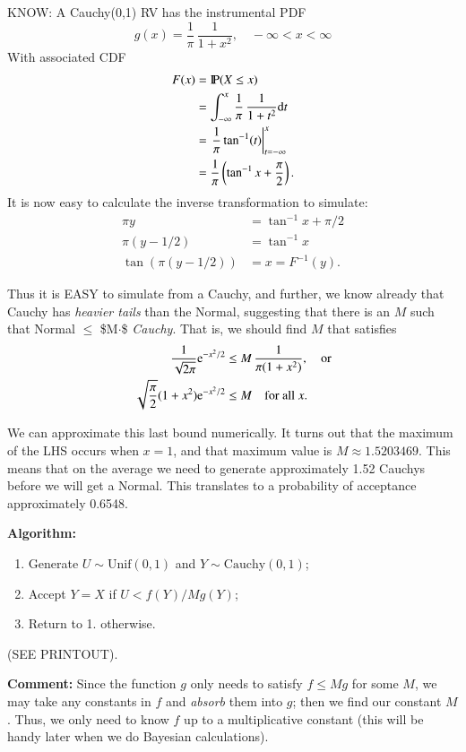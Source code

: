 \documentclass[captions=tableheading]{scrbook}
\begin{document}
KNOW: A Cauchy(0,1) RV has the instrumental PDF
\[
g(x)=\frac{1}{\pi}\,\frac{1}{1+x^{2}},\quad-\infty<x<\infty
\]
With associated CDF
\begin{align*}
F(x) & =\mathrm{I\hspace{-1.5pt}P}(X\leq x)\\
 & =\int_{-\infty}^{x}\frac{1}{\pi}\,\frac{1}{1+t^{2}}\mathrm{d} t\\  & =\left.\frac{1}{\pi}\tan^{-1}(t)\right|_{t=-\infty}^{x}\\
 & =\frac{1}{\pi}\left(\tan^{-1}x+\frac{\pi}{2}\right).
\end{align*}
It is now easy to calculate the inverse transformation to simulate:
\begin{align*}
\pi y & =\tan^{-1}x+\pi/2\\
\pi(y-1/2) & =\tan^{-1}x\\
\tan(\pi(y-1/2)) & =x=F^{-1}(y).
\end{align*}

Thus it is EASY to simulate from a Cauchy, and further, we know already that Cauchy has \emph{heavier tails} than the Normal, suggesting that there is an $M$ such that Normal $\leq$ \$M$\cdot$\$ \emph{Cauchy}.  That is, we should find $M$ that satisfies 
\begin{align*}
\frac{1}{\sqrt{2\pi}} \mathrm{e}^{-x^{2}/2} & \leq M\,\frac{1}{\pi(1+x^{2})},\quad\mbox{or}\\
\sqrt{\frac{\pi}{2}}(1+x^{2}) \mathrm{e}^{-x^{2}/2} & \leq M\quad\mbox{for all \ensuremath{x}.}
\end{align*}

We can approximate this last bound numerically. It turns out that the maximum of the LHS occurs when $x=1$, and that maximum value is $M\approx1.5203469$. This means that on the average we need to generate approximately 1.52 Cauchys before we will get a Normal. This translates to a probability of acceptance approximately 0.6548.

\textbf{Algorithm:}

\begin{enumerate}
\item Generate $U \sim \mathrm{Unif}(0,1)$ and $Y \sim \mathrm{Cauchy}(0,1)$;
\item Accept $Y = X$ if $U < f(Y)/Mg(Y)$;
\item Return to 1. otherwise.
\end{enumerate}

(SEE PRINTOUT).

\textbf{Comment:} Since the function $g$ only needs to satisfy $f\leq Mg$ for some $M$, we may take any constants in $f$ and \emph{absorb} them into $g$; then we find our constant $M$. Thus, we only need to know $f$ up to a multiplicative constant (this will be handy later when we do Bayesian calculations).
\end{document}
